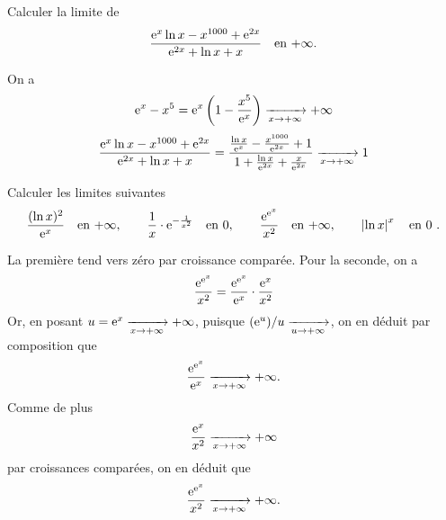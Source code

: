 \documentclass{magnolia}
\begin{document}
\begin{exos}
\exo Calculer la limite de
  \[\frac{{\rm e}^x\ln x-x^{1000}+{\rm e}^{2x}}{{\rm e}^{2x}+\ln x+x}
    \quad\text{en $+\infty$}.\]
    \begin{sol}
    On a
\[{\rm e}^x-x^5={\rm e}^x\left( 1-\frac{x^5}{{\rm e}^{x}}\right)\xrightarrow[x\rightarrow +\infty]{} +\infty\]
\[\frac{{\rm e}^x\ln x-x^{1000}+{\rm e}^{2x}}{{\rm e}^{2x}+\ln x+x} = \frac{\frac{\ln x}{{\rm e}^{x}}-\frac{x^{1000}}{{\rm e}^{2x}}+1}{1+\frac{\ln x}{{\rm e}^{2x}}+\frac{x}{{\rm e}^{2x}}}\xrightarrow[x\rightarrow +\infty]{} 1\]
    \end{sol}
\exo Calculer les limites suivantes
\[\frac{(\ln x)^2}{{\rm e}^x} \quad \text{en $+\infty$}, \qquad
  \frac{1}{x}\cdot {\rm e}^{-\frac{1}{x^2}} \quad \text{en 0}, \qquad
  \frac{{\rm e}^{{\rm e}^x}}{x^2} \quad\text{en $+\infty$}, \qquad
  \left|\ln x\right|^x \quad \text{en 0 .}\]
  \begin{sol}
    La première tend vers zéro par croissance comparée. Pour la seconde, on a
    \[\frac{{\rm e}^{{\rm e}^x}}{x^2}=\frac{{\rm e}^{{\rm e}^x}}{{\rm e}^x}\cdot\frac{{\rm e}^x}{x^2}\]
    Or, en posant $u={\rm e}^x\xrightarrow[x\rightarrow +\infty]{}+\infty$, puisque $({\rm e}^u)/u\xrightarrow[u\rightarrow +\infty]{}$, on en déduit par composition que
    \[\frac{{\rm e}^{{\rm e}^x}}{{\rm e}^x}\xrightarrow[x\rightarrow +\infty]{}+\infty.\]
    Comme de plus
    \[\frac{{\rm e}^x}{x^2}\xrightarrow[x\rightarrow +\infty]{}+\infty\]
    par croissances comparées, on en déduit que
    \[\frac{{\rm e}^{{\rm e}^x}}{x^2}\xrightarrow[x\rightarrow +\infty]{}+\infty.\]
        \end{sol}
\end{exos}
\end{document}
